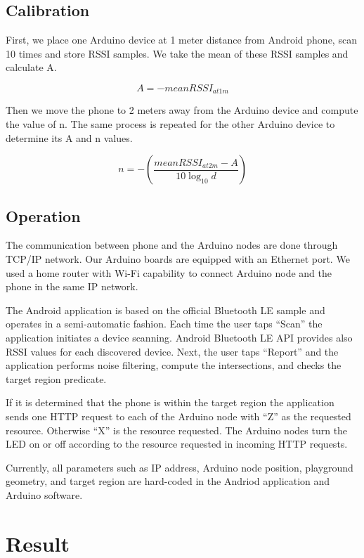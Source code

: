 \documentclass[conference,a4paper]{../../sty/IEEEtran}
\begin{document}
\subsection{Calibration}

First, we place one Arduino device at 1 meter distance from Android phone, scan 10 times and store RSSI samples.
We take the mean of these RSSI samples and calculate A.

\begin{equation}
 A = -meanRSSI_{at 1m}
\end{equation}

Then we move the phone to 2 meters away from the Arduino device and compute the value of n.
The same process is repeated for the other Arduino device to determine its A and n values.

\begin{equation}
 n = -(\frac{ meanRSSI_{at 2m}-A}{10 \log_{10}d})
\end{equation}


\subsection{Operation}

The communication between phone and the Arduino nodes are done through TCP/IP network.
Our Arduino boards are equipped with an Ethernet port.
We used a home router with Wi-Fi capability to connect Arduino node and the phone in the same IP network.

The Android application is based on the official Bluetooth LE sample and operates in a semi-automatic fashion.
Each time the user taps ``Scan'' the application initiates a device scanning.
Android Bluetooth LE API provides also RSSI values for each discovered device.
Next, the user taps ``Report'' and the application performs noise filtering, compute the intersections, and checks the target region predicate.

If it is determined that the phone is within the target region the application sends one HTTP request to each of the Arduino node with ``Z'' as the requested resource.
Otherwise ``X'' is the resource requested.
The Arduino nodes turn the LED on or off according to the resource requested in incoming HTTP requests.

Currently, all parameters such as IP address, Arduino node position, playground geometry, and target region are hard-coded in the Andriod application and Arduino software.

\section{Result}
\end{document}
